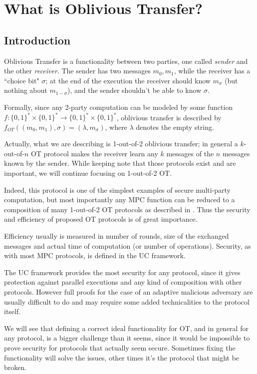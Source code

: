 \chapter{What is Oblivious Transfer?}

\section{Introduction}
Oblivious Transfer is a functionality between two parties, one called \emph{sender} and the other \emph{receiver}. The sender has two messages $m_0,m_1$, while the receiver has a ``choice bit" $\sigma$; at the end of the execution the receiver should know $m_\sigma$ (but nothing about $m_{1-\sigma}$), and the sender shouldn't be able to know $\sigma$.

Formally, since any 2-party computation can be modeled by some function $f:\{0,1\}^\ast\times\{0,1\}^\ast\to\{0,1\}^\ast\times\{0,1\}^\ast$, oblivious transfer is described by $f_{OT}((m_0,m_1), \sigma)=(\lambda, m_\sigma)$, where $\lambda$ denotes the empty string.

Actually, what we are describing is 1-out-of-2 oblivious transfer; in general a $k$-out-of-$n$ OT protocol makes the receiver learn any $k$ messages of the $n$ messages known by the sender. While keeping note that those protocols exist and are important, we will continue focusing on 1-out-of-2 OT.

Indeed, this protocol is one of the simplest examples of secure multi-party computation, but most importantly any MPC function can be reduced to a composition of many 1-out-of-2 OT protocols as described in \cite{GMW}. Thus the security and efficiency of proposed OT protocols is of great importance.

Efficiency usually is measured in number of rounds, size of the exchanged messages and actual time of computation (or number of operations). Security, as with most MPC protocols, is defined in the UC framework.

The UC framework provides the most security for any protocol, since it gives protection against parallel executions and any kind of composition with other protocols. However full proofs for the case of an adaptive malicious adversary are usually difficult to do and may require some added technicalities to the protocol itself.

We will see that defining a correct ideal functionality for OT, and in general for any protocol, is a bigger challenge than it seems, since it would be impossible to prove security for protocols that actually seem secure. Sometimes fixing the functionality will solve the issues, other times it's the protocol that might be broken.

